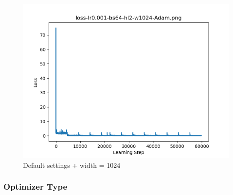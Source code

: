 \documentclass{article}[12pt]
\begin{document}
    \begin{figure}[H]
        \includegraphics[width=\linewidth]{testsResults/loss/w/loss-lr0.001-bs64-hl2-w1024-Adam.png}
        \caption{Default settings + width = 1024}
        \endminipage
    \end{figure}

\subsubsection{Optimizer Type}
\end{document}

